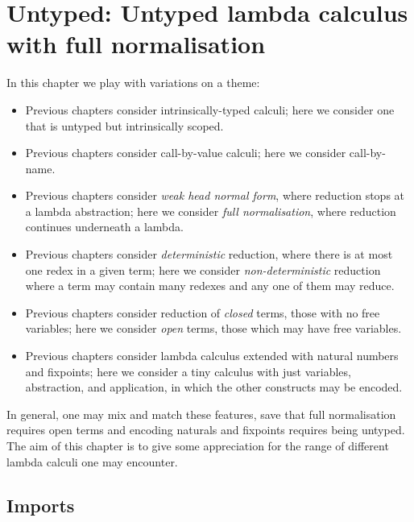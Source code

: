 \hypertarget{Untyped}{%
\chapter{Untyped: Untyped lambda calculus with full
normalisation}\label{Untyped}}

\begin{fence}
\begin{code}%
\>[0]\AgdaSpace{}%
\AgdaSpace{}%
\<%
\end{code}
\end{fence}

In this chapter we play with variations on a theme:

\begin{itemize}
\item
  Previous chapters consider intrinsically-typed calculi; here we
  consider one that is untyped but intrinsically scoped.
\item
  Previous chapters consider call-by-value calculi; here we consider
  call-by-name.
\item
  Previous chapters consider \emph{weak head normal form}, where
  reduction stops at a lambda abstraction; here we consider \emph{full
  normalisation}, where reduction continues underneath a lambda.
\item
  Previous chapters consider \emph{deterministic} reduction, where there
  is at most one redex in a given term; here we consider
  \emph{non-deterministic} reduction where a term may contain many
  redexes and any one of them may reduce.
\item
  Previous chapters consider reduction of \emph{closed} terms, those
  with no free variables; here we consider \emph{open} terms, those
  which may have free variables.
\item
  Previous chapters consider lambda calculus extended with natural
  numbers and fixpoints; here we consider a tiny calculus with just
  variables, abstraction, and application, in which the other constructs
  may be encoded.
\end{itemize}

In general, one may mix and match these features, save that full
normalisation requires open terms and encoding naturals and fixpoints
requires being untyped. The aim of this chapter is to give some
appreciation for the range of different lambda calculi one may
encounter.

\hypertarget{imports}{%
\section{Imports}\label{imports}}


